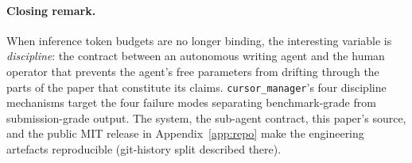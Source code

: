 \paragraph{Closing remark.}
When inference token budgets are no longer binding, the interesting
variable is \emph{discipline}: the contract between an autonomous
writing agent and the human operator that prevents the agent's free
parameters from drifting through the parts of the paper that
constitute its claims. \texttt{cursor\_manager}'s four discipline
mechanisms target the four failure modes separating benchmark-grade
from submission-grade output. The system, the sub-agent contract,
this paper's source, and the public MIT release in Appendix~\ref{app:repo}
make the engineering artefacts reproducible (git-history split described
there).
\label{sec:conclusion}
